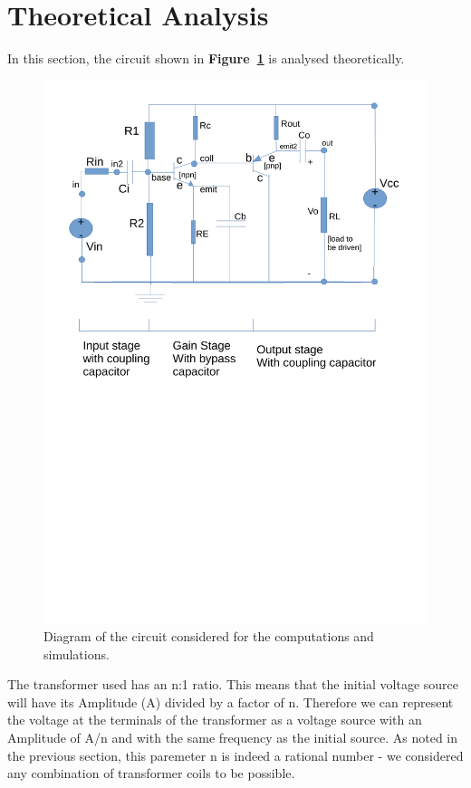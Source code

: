 \section{Theoretical Analysis}
\label{sec:analysis}

In this section, the circuit shown in \textbf{Figure~\ref{fig:diagram_t4}} is analysed
theoretically.
\begin{figure}[H] \centering
\includegraphics[width=0.95\linewidth]{diagram_t4.pdf}
\vspace{-6cm}
\caption{Diagram of the circuit considered for the computations and simulations.}
\label{fig:diagram_t4}
\end{figure}

The transformer used has an n:1 ratio. This means that the initial voltage source will have its Amplitude (A) divided by a factor of n. Therefore we can represent the voltage at the terminals of the transformer as a voltage source with an Amplitude of A/n and with the same frequency as the initial source. As noted in the previous section, this paremeter n is indeed a rational number - we considered any combination of transformer coils to be possible.

